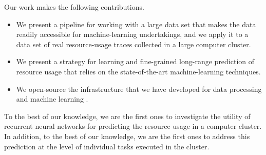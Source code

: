 Our work makes the following contributions.
\begin{itemize}
\item We present a pipeline for working with a large data set that makes the
data readily accessible for machine-learning undertakings, and we apply it to a
data set of real resource-usage traces collected in a large computer cluster.

\item We present a strategy for learning and fine-grained long-range prediction
of resource usage that relies on the state-of-the-art machine-learning
techniques.

\item We open-source the infrastructure that we have developed for data
processing and machine learning \cite{sources}.
\end{itemize}

To the best of our knowledge, we are the first ones to investigate the utility
of recurrent neural networks for predicting the resource usage in a computer
cluster. In addition, to the best of our knowledge, we are the first ones to
address this prediction at the level of individual tasks executed in the
cluster.
